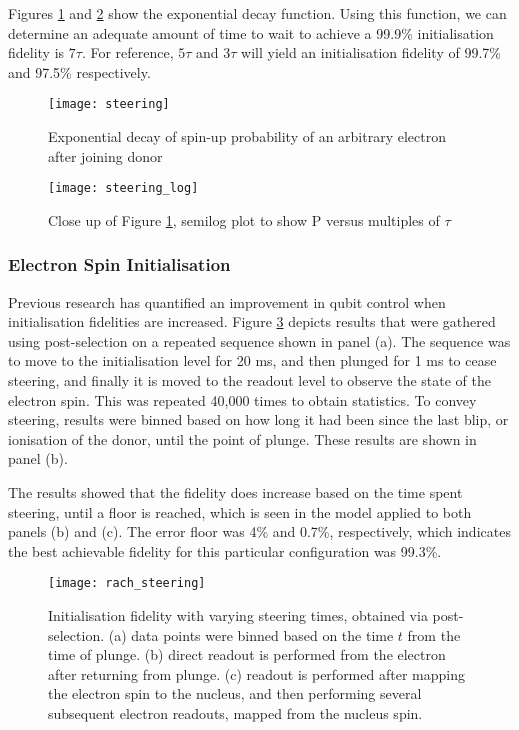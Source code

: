 		Figures \ref{fig::spin_steering} and \ref{fig::spin_steering_log} show the exponential decay function. Using this function, we can determine an adequate amount of time to wait to achieve a 99.9\% initialisation fidelity is $7 \tau$. For reference, $5 \tau$ and $3 \tau$ will yield an initialisation fidelity of 99.7\% and 97.5\% respectively.
		
		\begin{figure}[htbp!]
			\centering
			\texttt{[image: steering]}
			\caption{Exponential decay of spin-up probability of an arbitrary electron after joining donor}
			\label{fig::spin_steering}
		\end{figure}
		
		
		\begin{figure}[htbp!]
			\centering
			\texttt{[image: steering\_log]}
			\caption{Close up of Figure \ref{fig::spin_steering}, semilog plot to show P versus multiples of $\tau$}
			\label{fig::spin_steering_log}
		\end{figure}

\subsubsection{Electron Spin Initialisation}
\label{sec::spin_init}
	Previous research \cite{rachpon_thesis} has quantified an improvement in qubit control when initialisation fidelities are increased. Figure \ref{fig::rach_steering} depicts results that were gathered using post-selection on a repeated sequence shown in panel (a). The sequence was to move to the initialisation level for 20 ms, and then plunged for 1 ms to cease steering, and finally it is moved to the readout level to observe the state of the electron spin. This was repeated 40,000 times to obtain statistics. To convey steering, results were binned based on how long it had been since the last blip, or ionisation of the donor, until the point of plunge. These results are shown in panel (b).
	
	The results showed that the fidelity does increase based on the time spent steering, until a floor is reached, which is seen in the model applied to both panels (b) and (c). The error floor was 4\% and 0.7\%, respectively, which indicates the best achievable fidelity for this particular configuration was 99.3\%.
	
	\begin{figure}[htbp!]
		\centering
		\texttt{[image: rach\_steering]}
		\caption[Initialisation fidelity with varying steering times, via post-selection.]{Initialisation fidelity with varying steering times, obtained via post-selection.
			(a) data points were binned based on the time $t$ from the time of plunge. 
			(b) direct readout is performed from the electron after returning from plunge.
			(c) readout is performed after mapping the electron spin to the nucleus, and then performing several subsequent electron readouts, mapped from the nucleus spin.
			\cite{rachpon_thesis}}
		\label{fig::rach_steering}
	\end{figure}
	
